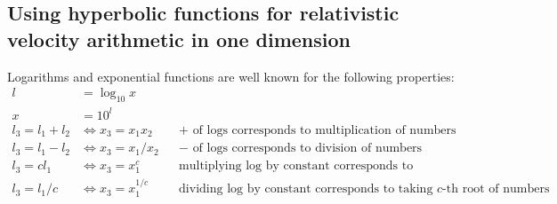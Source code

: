 \documentclass[a4paper]{article}
\theoremstyle{plain}
\theoremstyle{definition}
\begin{document}
\subsection{Using hyperbolic functions for relativistic velocity arithmetic in one dimension}
\label{app:1drelVelocityUsingHyperbolicFns}

Logarithms and exponential functions are well known for the following
properties:
\begin{align*}
l & = \log_{10} x \\
x & = 10^l \\
l_3 = l_1 + l_2 & \Leftrightarrow x_3 = x_1 x_2 & & \text{$+$ of logs corresponds to multiplication of numbers} \\
l_3 = l_1 - l_2 & \Leftrightarrow x_3 = x_1 / x_2 & & \text{$-$ of logs corresponds to division of numbers} \\
l_3 = c l_1 & \Leftrightarrow x_3 = x_1^c & & \text{multiplying log by constant corresponds to exponentiation of numbers} \\
l_3 = l_1/c & \Leftrightarrow x_3 = x_1^{1/c} & & \text{dividing log by constant corresponds to taking $c$-th root of numbers} \\
\end{align*}
\end{document}
